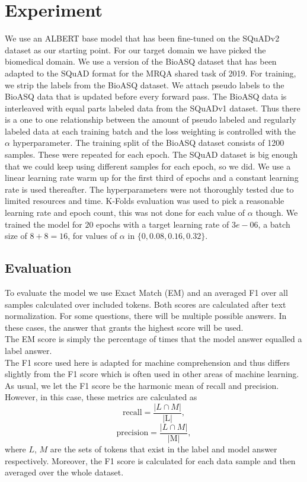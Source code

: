 \documentclass[twoside,twocolumn]{article}
\begin{document}

\section{Experiment}
We use an ALBERT base model that has been fine-tuned on the SQuADv2 dataset as
our starting point. For our target domain we have picked the biomedical domain.
We use a version of the BioASQ dataset that has been adapted to
the SQuAD format for the MRQA shared task of 2019. For training, we strip the
labels from the BioASQ dataset. We attach pseudo labels to the BioASQ data that
is updated before every forward pass. The BioASQ
data is interleaved with equal parts labeled data from the SQuADv1 dataset.
Thus there is a one to one relationship between the amount of pseudo labeled and
regularly labeled data at each training batch and the loss weighting is
controlled with the $\alpha$ hyperparameter. The training split of the BioASQ
dataset consists of 1200 samples. These were repeated for each epoch. The SQuAD
dataset is big enough that we could keep using different samples for each epoch,
so we did.
We use a linear learning rate warm up for the first third of epochs and a
constant learning rate is used thereafter. 
The hyperparameters were not thoroughly tested due to limited resources and
time. K-Folds evaluation was used to pick a reasonable learning rate and epoch
count, this was not done for each value of $\alpha$ though. We trained the model
for $20$ epochs with a target learning rate of $3e-06$, a batch size of $8
+ 8 = 16$, for values of $\alpha$ in $\{0, 0.08, 0.16, 0.32\}$.


\subsection{Evaluation}
To evaluate the model we use Exact Match (EM) and an averaged F1 over all samples
calculated over included tokens. Both scores are calculated after text
normalization. For some questions, there will be multiple possible answers. In
these cases, the answer that grants the highest score will be used. \\

The EM score is simply the percentage of times that the model answer equalled
a label answer.  \\

The F1 score used here is adapted for machine comprehension and thus differs
slightly from the F1 score which is often used in other areas of machine
learning. As usual, we let the F1 score be the harmonic mean of recall and
precision. However, in this case, these metrics are calculated as 
\[
	\text{recall} = \frac{|L \cap M|}{\text{|L|}},
\]
\[
	\text{precision} = \frac{|L \cap M|}{\text{|M|}},
\]
where $L$, $M$ are the sets of tokens that exist in the label and model answer
respectively. Moreover, the F1 score is calculated for each data sample and
then averaged over the whole dataset.
\end{document}
